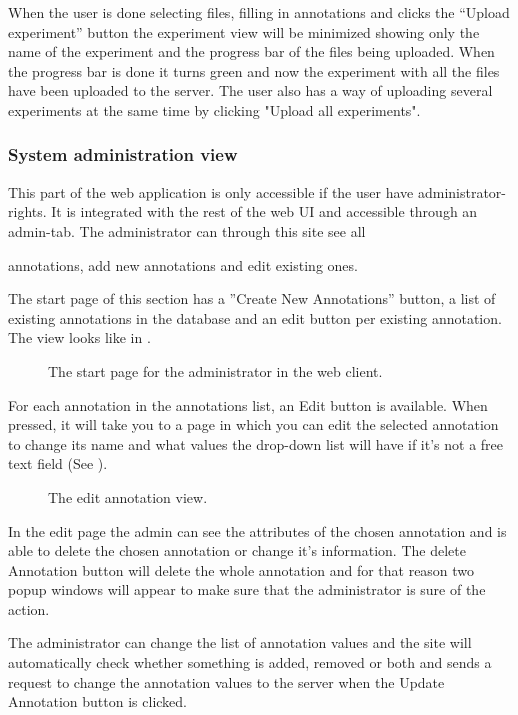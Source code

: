 When the user is done selecting files, filling in annotations and clicks the “Upload experiment” button the experiment view will be minimized showing only the name of the experiment and the progress bar of the files being uploaded. When the progress bar is done it turns green and now the experiment with all the files have been uploaded to the server. The user also has a way of uploading several experiments at the same time by clicking "Upload all experiments". 

\subsubsection{System administration view}

This part of the web application is only accessible if the user have administrator-rights. It is integrated with the rest of the web UI and accessible through an admin-tab. The administrator can through this site see all 

annotations, add new annotations and edit existing ones.

The start page of this section has a ''Create New Annotations'' button, a list of existing annotations in the database and an edit button per existing annotation. 
The view looks like in . 

\begin{figure}[h]
 \caption{The start page for the administrator in the web client.}
 \label{adm__web_annotationView}
\end{figure}

For each annotation in the annotations list, an Edit button is available. 
When pressed, it will take you to a page in which you can edit the selected annotation to change its name and what values the drop-down list will have if it's not a free text field (See ). 

\begin{figure}[h]
 \caption{The edit annotation view.}
 \label{adm_web_editView}
\end{figure}
In the edit page the admin can see the attributes of the chosen annotation and is able to delete the chosen annotation or change it's information.
The delete Annotation button will delete the whole annotation and for that reason two popup windows will appear to make sure that the administrator is sure of the action.

The administrator can change the list of annotation values and the site will automatically check whether 
something is added, removed or both and sends a request to change the annotation values to the server when the Update Annotation button is clicked.

